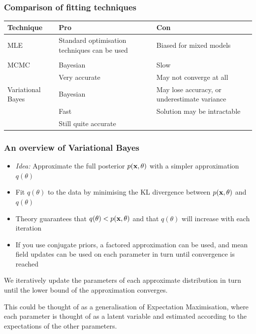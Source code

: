\documentclass{beamer}
\begin{document}
\
\begin{frame}
\frametitle{Comparison of fitting techniques}
\begin{tabular}{p{2cm}p{3.75cm}p{3.75cm}}
Technique & Pro & Con \\
\hline
MLE & Standard optimisation techniques can be used & Biased for mixed models \\
& & \\ %
\hline
MCMC & Bayesian & Slow \\
	& Very accurate &  May not converge at all \\
\hline
Variational Bayes & Bayesian & May lose accuracy, or underestimate variance \\
& Fast  & Solution may be intractable \\ 
& Still quite accurate & \\
\hline
\end{tabular}

\end{frame}

\begin{frame}
\frametitle{An overview of Variational Bayes}
\begin{itemize}
\item \emph{Idea:} Approximate the full posterior $p(\bf x, \theta)$ with a simpler approximation $q(\theta)$
\item Fit $q(\theta)$ to the data by minimising the KL divergence between $p(\bf x, \theta)$ and $q(\theta)$
\item Theory guarantees that $q(\theta) < p(\bf x, \theta)$ and that $q(\theta)$ will
increase with each iteration
\item If you use conjugate priors, a factored approximation can be used, and mean field updates can be used on
each parameter in turn until convergence is reached
\end{itemize}
We iteratively update the parameters of each approximate distribution
in turn until the lower bound of the approximation converges.

This could be thought of as a generalisation of Expectation Maximisation, where each parameter is thought of as a latent
variable and estimated according to the expectations of the other parameters.
\end{frame}
\end{document}
